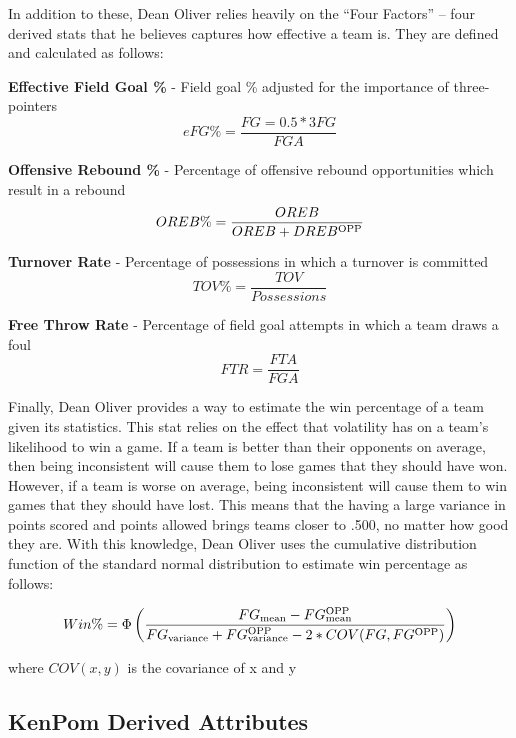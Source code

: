 \documentclass[]{article}
\def\SPSB#1#2{\rlap{\textsuperscript{#1}}\SB{#2}}
\def\SP#1{\textsuperscript{{#1}}}
\def\SB#1{\textsubscript{{#1}}}
\begin{document}
In addition to these, Dean Oliver relies heavily on the ``Four Factors'' -- four derived stats that he believes captures how effective a team is. They are defined and calculated as follows:

\textbf{Effective Field Goal \%} - Field goal \% adjusted for the importance of three-pointers
\begin{equation}
	eFG\% = \frac{FG = 0.5*3FG}{FGA}
\end{equation}

\textbf{Offensive Rebound \%} - Percentage of offensive rebound opportunities which result in a rebound
\begin{equation}
	OREB\% = \frac{OREB}{OREB + DREB\SP{OPP}}
\end{equation}

\textbf{Turnover Rate} - Percentage of possessions in which a turnover is committed
\begin{equation}
	TOV\% = \frac{TOV}{Possessions}
\end{equation}

\textbf{Free Throw Rate} - Percentage of field goal attempts in which a team draws a foul
\begin{equation}
	FTR = \frac{FTA}{FGA}
\end{equation}

Finally, Dean Oliver provides a way to estimate the win percentage of a team given its statistics. This stat relies on the effect that volatility has on a team's likelihood to win a game. If a team is better than their opponents on average, then being inconsistent will cause them to lose games that they should have won. However, if a team is worse on average, being inconsistent will cause them to win games that they should have lost. This means that the having a large variance in points scored and points allowed brings teams closer to .500, no matter how good they are. With this knowledge, Dean Oliver uses the cumulative distribution function of the standard normal distribution to estimate win percentage as follows:

\begin{equation}
	Win\% = \Phi\left(\frac{FG\SB{mean}-FG\SPSB{OPP}{mean}}{FG\SB{variance}+FG\SPSB{OPP}{variance} - 2*COV(FG, FG\SP{OPP})}\right)
\end{equation}

where $COV(x,y)$ is the covariance of x and y

\subsection{KenPom Derived Attributes}
\end{document}
